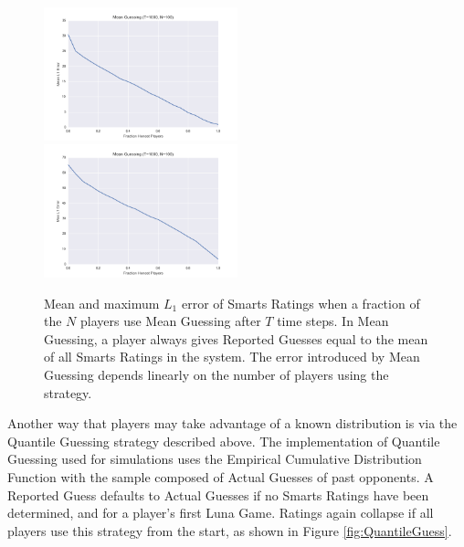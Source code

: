 \begin{figure}[H]
\centerline{%
\includegraphics[width=0.5\textwidth]{figures/robustness/Mean_Guessing31.png}%
\includegraphics[width=0.5\textwidth] {figures/robustness/Mean_Guessing32.png}%
}%
\caption{Mean and maximum $L_1$ error of Smarts Ratings when a fraction of the $N$ players use Mean Guessing after $T$ time steps. In Mean Guessing, a player always gives Reported Guesses equal to the mean of all Smarts Ratings in the system. The error introduced by Mean Guessing depends linearly on the number of players using the strategy.}
\label{fig:MeanGuess}
\end{figure}

Another way that players may take advantage of a known distribution is via the Quantile Guessing strategy described above. The implementation of Quantile Guessing used for simulations uses the Empirical Cumulative Distribution Function with the sample composed of Actual Guesses of past opponents. A Reported Guess defaults to Actual Guesses if no Smarts Ratings have been determined, and for a player's first Luna Game. Ratings again collapse if all players use this strategy from the start, as shown in Figure \ref{fig:QuantileGuess}. 

